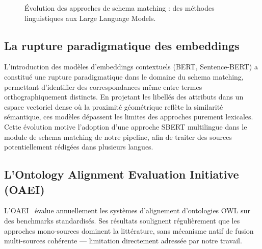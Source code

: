 \begin{figure}[ht]
    
    \vspace{0.5cm}
    \caption{Évolution des approches de schema matching : des méthodes linguistiques aux Large Language Models.}
    \label{fig:evolution_schema_matching}
\end{figure}

\subsection{La rupture paradigmatique des embeddings}
L'introduction des modèles d'embeddings contextuels (BERT, Sentence-BERT) a constitué une rupture paradigmatique dans le domaine du schema matching, permettant d'identifier des correspondances même entre termes orthographiquement distincts. En projetant les libellés des attributs dans un espace vectoriel dense où la proximité géométrique reflète la similarité sémantique, ces modèles dépassent les limites des approches purement lexicales. Cette évolution motive l'adoption d'une approche SBERT multilingue dans le module de schema matching de notre pipeline, afin de traiter des sources potentiellement rédigées dans plusieurs langues.

\subsection{L'Ontology Alignment Evaluation Initiative (OAEI)}
L'OAEI~\cite{oaei2024} évalue annuellement les systèmes d'alignement d'ontologies OWL sur des benchmarks standardisés. Ses résultats soulignent régulièrement que les approches mono-sources dominent la littérature, sans mécanisme natif de fusion multi-sources cohérente — limitation directement adressée par notre travail.

